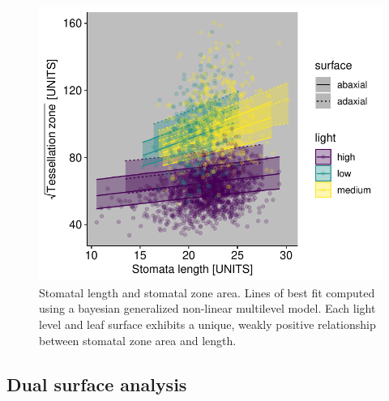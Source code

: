 \documentclass[12pt,halfline,a4paper,]{ouparticle}
\begin{document}
\begin{figure}[ht]
\includegraphics[width = \textwidth]{figures/length-area.pdf}
\caption{Stomatal length and stomatal zone area. Lines of best fit computed using a bayesian generalized non-linear multilevel model. Each light level and leaf surface exhibits a unique, weakly positive relationship between stomatal zone area and length.}
\label{fig:length-area}
\end{figure}

\hypertarget{dual-surface-analysis-1}{%
\subsection{Dual surface analysis}\label{dual-surface-analysis-1}}
\end{document}
